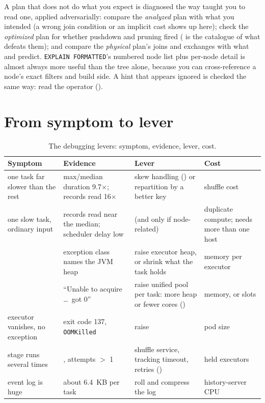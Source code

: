 A plan that does not do what you expect is diagnosed the way 
taught you to read one, applied adversarially: compare the \emph{analyzed} plan
with what you intended (a wrong join condition or an implicit cast shows up here);
check the \emph{optimized} plan for whether pushdown and pruning fired
( is the catalogue of what defeats them); and
compare the \emph{physical} plan's joins and exchanges with what  and
 predict. \texttt{EXPLAIN FORMATTED}'s numbered node list plus
per-node detail is almost always more useful than the tree alone, because you can
cross-reference a node's exact filters and build side. A hint that appears ignored
is checked the same way: read the operator ().

\section{From symptom to lever}
\label{sec:debug-levers}

\begin{table}[htbp]
\centering\footnotesize
\renewcommand{\arraystretch}{1.25}
\begin{tabular}{@{}P{3.1cm}P{3.9cm}P{4.0cm}P{3.1cm}@{}}
\toprule
\textbf{Symptom} & \textbf{Evidence} & \textbf{Lever} & \textbf{Cost} \\
\midrule
one task far slower than the rest & max/median duration 9.7$\times$; records read 16$\times$ & skew handling () or repartition by a better key & shuffle cost \\
one slow task, ordinary input & records read near the median; scheduler delay low &  (and only if node-related) & duplicate compute; needs more than one host \\
 & exception class names the JVM heap & raise executor heap, or shrink what the task holds & memory per executor \\
 & ``Unable to acquire \dots\ got 0'' & raise unified pool per task: more heap or fewer cores () & memory, or slots \\
executor vanishes, no exception & exit code 137, \texttt{OOMKilled} & raise  & pod size \\
stage runs several times & , attempts $>$ 1 & shuffle service, tracking timeout, retries () & held executors \\
event log is huge & about 6.4~KB per task & roll and compress the log & history-server CPU \\
\bottomrule
\end{tabular}
\caption{The debugging levers: symptom, evidence, lever, cost.}
\label{tab:debug-levers}
\end{table}

